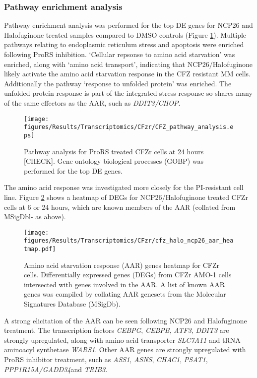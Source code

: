 \subsubsection{Pathway enrichment analysis}
Pathway enrichment analysis was performed for the top DE genes for NCP26 and Halofuginone treated samples compared to DMSO controls (Figure \ref{fig:cfz_pathway}).
Multiple pathways relating to endoplasmic reticulum stress and apoptosis were enriched following ProRS inhibition.
`Cellular repsonse to amino acid starvation' was enriched, along with `amino acid transport', indicating that NCP26/Halofuginone likely activate the amino acid starvation response in the CFZ resistant MM cells.
Additionally the pathway `response to unfolded protein' was enriched.
The unfolded protein response is part of the integrated stress response so shares many of the same effectors as the AAR, such as \textit{DDIT3/CHOP}.

\begin{figure}[htb]
\centering
\texttt{[image: figures/Results/Transcriptomics/CFzr/CFZ\_pathway\_analysis.eps]}
\caption[Pathway analysis for ProRS inhibitor-treated CFZr cells]{Pathway analysis for ProRS treated CFZr cells at 24 hours [CHECK].
Gene ontology biological processes (GOBP) was performed for the top DE genes.
}
\label{fig:cfz_pathway}
\end{figure}
%
The amino acid response was investigated more closely for the PI-resistant cell line.
Figure \ref{fig:cfz_aar_heatmap} shows a heatmap of DEGs for NCP26/Halofuginone treated CFZr cells at 6 or 24 hours, which are known members of the AAR (collated from MSigDbl- as above).

\begin{figure}[p]
\centering
\texttt{[image: figures/Results/Transcriptomics/CFzr/cfz\_halo\_ncp26\_aar\_heatmap.pdf]}
\caption[Amino acid starvation response genes heatmap CFZr cells]{Amino acid starvation response (AAR) genes heatmap for CFZr cells.
Differentially expressed genes (DEGs) from CFZr AMO-1 cells intersected with genes involved in the AAR.
A list of known AAR genes was compiled by collating AAR genesets from the Molecular Signatures Database (MSigDb).
}
\label{fig:cfz_aar_heatmap}
\end{figure}
A strong elicitation of the AAR can be seen following NCP26 and Halofuginone treatment.
The transcription factors \textit{CEBPG}, \textit{CEBPB}, \textit{ATF3}, \textit{DDIT3} are strongly upregulated, along with amino acid transporter \textit{SLC7A11} and tRNA aminoacyl synthetase \textit{WARS1}.
Other AAR genes are strongly upregulated with ProRS inhibitor treatment, such as \textit{ASS1}, \textit{ASNS}, \textit{CHAC1}, \textit{PSAT1}, \textit{PPP1R15A/GADD34}and \textit{TRIB3}.

